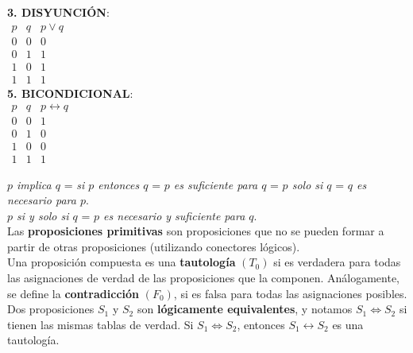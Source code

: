 \documentclass[11pt,a4paper]{article}
\begin{document}
\begin{multicols}{3}
\noindent \textbf{3. DISYUNCI\'ON}: \\
\indent $\begin{array}{|cc|c|}
p & q & p \lor q\\
\hline
0 & 0 & 0\\
0 & 1 & 1\\
1 & 0 & 1\\
1 & 1 & 1
\end{array}$\\

\noindent \textbf{5. BICONDICIONAL}: \\
\indent $\begin{array}{|cc|c|}
p & q & p \leftrightarrow q\\
\hline
0 & 0 & 1\\
0 & 1 & 0\\
1 & 0 & 0\\
1 & 1 & 1
\end{array}$\\
\end{multicols}

\noindent \textit{$p$ implica $q$} = \textit{si $p$ entonces $q$} = \textit{$p$ es suficiente para $q$} = \textit{$p$ solo si $q$} = \textit{$q$ es necesario para $p$}.\\
\noindent \textit{$p$ si y solo si $q$} = \textit{$p$ es necesario y suficiente para $q$}.\\

\noindent Las \textbf{proposiciones primitivas} son proposiciones que no se pueden formar a partir de otras proposiciones (utilizando conectores l\'ogicos).\\

\noindent Una proposici\'on compuesta es una \textbf{tautolog\'ia} $(T_0)$ si es verdadera para todas las asignaciones de verdad de las proposiciones que la componen. An\'alogamente, se define la \textbf{contradicci\'on} $(F_0)$, si es falsa para todas las asignaciones posibles.\\

\noindent Dos proposiciones $S_1$ y $S_2$ son \textbf{l\'ogicamente equivalentes}, y notamos $S_1 \Leftrightarrow S_2$ si tienen las mismas tablas de verdad. Si $S_1 \Leftrightarrow S_2$, entonces $S_1 \leftrightarrow S_2$ es una tautolog\'ia.
\end{document}
